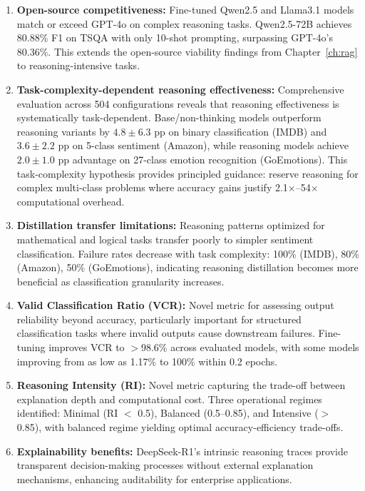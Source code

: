 \begin{enumerate}[leftmargin=*]
    \item \textbf{Open-source competitiveness:} Fine-tuned Qwen2.5 and Llama3.1 models match or exceed GPT-4o on complex reasoning tasks. Qwen2.5-72B achieves 80.88\% F1 on TSQA with only 10-shot prompting, surpassing GPT-4o's 80.36\%. This extends the open-source viability findings from Chapter~\ref{ch:rag} to reasoning-intensive tasks.
    
    \item \textbf{Task-complexity-dependent reasoning effectiveness:} Comprehensive evaluation across 504 configurations reveals that reasoning effectiveness is systematically task-dependent. Base/non-thinking models outperform reasoning variants by $4.8 \pm 6.3$ pp on binary classification (IMDB) and $3.6 \pm 2.2$ pp on 5-class sentiment (Amazon), while reasoning models achieve $2.0 \pm 1.0$ pp advantage on 27-class emotion recognition (GoEmotions). This task-complexity hypothesis provides principled guidance: reserve reasoning for complex multi-class problems where accuracy gains justify 2.1$\times$--54$\times$ computational overhead.
    
    \item \textbf{Distillation transfer limitations:} Reasoning patterns optimized for mathematical and logical tasks transfer poorly to simpler sentiment classification. Failure rates decrease with task complexity: 100\% (IMDB), 80\% (Amazon), 50\% (GoEmotions), indicating reasoning distillation becomes more beneficial as classification granularity increases.
    
    \item \textbf{Valid Classification Ratio (VCR):} Novel metric for assessing output reliability beyond accuracy, particularly important for structured classification tasks where invalid outputs cause downstream failures. Fine-tuning improves VCR to $>$98.6\% across evaluated models, with some models improving from as low as 1.17\% to 100\% within 0.2 epochs.
    
    \item \textbf{Reasoning Intensity (RI):} Novel metric capturing the trade-off between explanation depth and computational cost. Three operational regimes identified: Minimal (RI $<$ 0.5), Balanced (0.5--0.85), and Intensive ($>$ 0.85), with balanced regime yielding optimal accuracy-efficiency trade-offs.
    
    \item \textbf{Explainability benefits:} DeepSeek-R1's intrinsic reasoning traces provide transparent decision-making processes without external explanation mechanisms, enhancing auditability for enterprise applications.
    

\end{enumerate}
